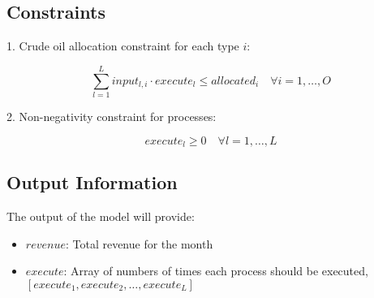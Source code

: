 \documentclass{article}
\begin{document}
\subsection*{Constraints}
1. Crude oil allocation constraint for each type $i$:

\[
\sum_{l=1}^{L} input_{l,i} \cdot execute_l \leq allocated_i \quad \forall i = 1, \ldots, O
\]

2. Non-negativity constraint for processes:

\[
execute_l \geq 0 \quad \forall l = 1, \ldots, L
\]

\subsection*{Output Information}
The output of the model will provide:
\begin{itemize}
    \item $revenue$: Total revenue for the month
    \item $execute$: Array of numbers of times each process should be executed, $[execute_1, execute_2, \ldots, execute_L]$
\end{itemize}
\end{document}
